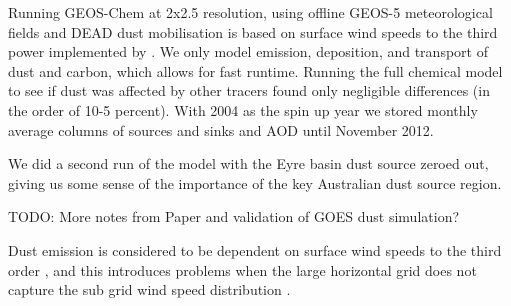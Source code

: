 Running GEOS-Chem at 2x2.5 resolution, using offline GEOS-5 meteorological fields and DEAD dust mobilisation is based on surface wind speeds to the third power implemented by \cite{Duncan_Fairlie_2007}. We only model emission, deposition, and transport of dust and carbon, which allows for fast runtime. Running the full chemical model to see if dust was affected by other tracers found only negligible differences (in the order of 10-5 percent). With 2004 as the spin up year we stored monthly average columns of sources and sinks and AOD until November 2012.

We did a second run of the model with the Eyre basin dust source zeroed out, giving us some sense of the importance of the key Australian dust source region.

TODO: More notes from Paper and validation of GOES dust simulation?
  
Dust emission is considered to be dependent on surface wind speeds to the third order \cite{Duncan_Fairlie_2007}, and this introduces problems when the large horizontal grid does not capture the sub grid wind speed distribution \cite{Ridley_2013}.
  
  
  
  
  
  
  
  
  